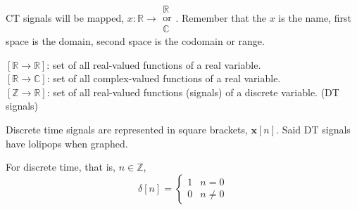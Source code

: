 \documentclass{article}
\begin{document}
CT signals will be mapped, $x : \mathbb{R} \to \begin{array}{c} \mathbb{R} \\ \text{or} \\ \mathbb{C} \end{array}$. 
Remember that the $x$ is the name, first space is the domain, second space is the codomain or range.

$[ \mathbb{R} \to \mathbb{R} ]$: set of all real-valued functions of a real variable. \\
$[ \mathbb{R} \to \mathbb{C} ]$: set of all complex-valued functions of a real variable. \\
$ [\mathbb{Z} \to \mathbb{R} ]$: set of all real-valued functions (signals) of a discrete variable. (DT signals)

Discrete time signals are represented in square brackets, $\bm{x}[n]$. Said DT signals have lolipops when graphed.

    
    
    

\begin{definition}
For discrete time, that is, $n \in \mathbb{Z}$,
$$ \delta[n] = \begin{cases}
    1 & n = 0 \\
    0 & n \neq 0
\end{cases} $$
\end{definition}
\end{document}
